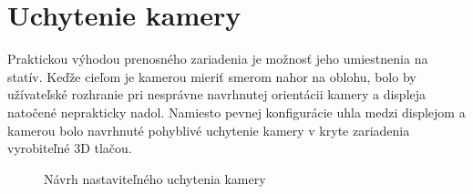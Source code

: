     \section{Uchytenie kamery}

        Praktickou výhodou prenosného zariadenia je možnosť jeho umiestnenia na statív. Keďže cieľom je kamerou mieriť smerom nahor na oblohu, bolo by užívateľské rozhranie pri nesprávne navrhnutej orientácii kamery a displeja natočené neprakticky nadol. Namiesto pevnej konfigurácie uhla medzi displejom a kamerou bolo navrhnuté pohyblivé uchytenie kamery v kryte zariadenia vyrobiteľné 3D tlačou.

        \begin{figure}[H]
            \centering
            \caption{Návrh nastaviteľného uchytenia kamery}
        \end{figure}

